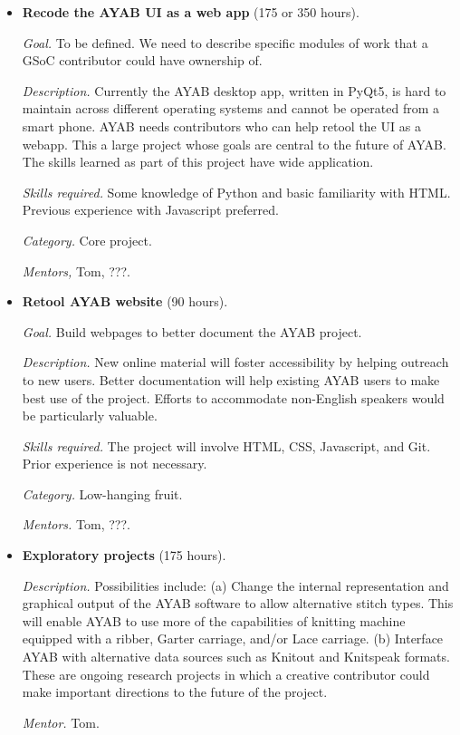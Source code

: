 \documentclass{article}
\begin{document}
\begin{itemize}
\item \textbf{Recode the AYAB UI as a web app} (175 or 350 hours). 

\textit{Goal.} To be defined. We need to describe specific modules of work that a GSoC contributor could have ownership of. 

\textit{Description.} Currently the AYAB desktop app, written in PyQt5, is hard to maintain across different operating systems and cannot be operated from a smart phone. AYAB needs contributors who can help retool the UI as a webapp. This a large project whose goals are central to the future of AYAB. The skills learned as part of this project have wide application.

\textit{Skills required.} Some knowledge of Python and basic familiarity with HTML. Previous experience with Javascript preferred.

\textit{Category.} Core project. 

\textit{Mentors,} Tom, ???.


\item \textbf{Retool AYAB website} (90 hours). 

\textit{Goal.} Build webpages to better document the AYAB project. 

\textit{Description.} New online material will foster accessibility by helping outreach to new users. Better documentation will help existing AYAB users to make best use of the project. Efforts to accommodate non-English speakers would be particularly valuable.

\textit{Skills required.} The project will involve HTML, CSS, Javascript, and Git. Prior experience is not necessary.

\textit{Category.} Low-hanging fruit. 

\textit{Mentors.} Tom, ???.


\item \textbf{Exploratory projects} (175 hours). 

\textit{Description.} Possibilities include: (a) Change the internal representation and graphical output of the AYAB software to allow alternative stitch types. This will enable AYAB to use more of the capabilities of knitting machine equipped with a ribber, Garter carriage, and/or Lace carriage. (b) Interface AYAB with alternative data sources such as Knitout and Knitspeak formats. These are ongoing research projects in which a creative contributor could make important directions to the future of the project.

\textit{Mentor.} Tom.
\end{itemize}
\end{document}
